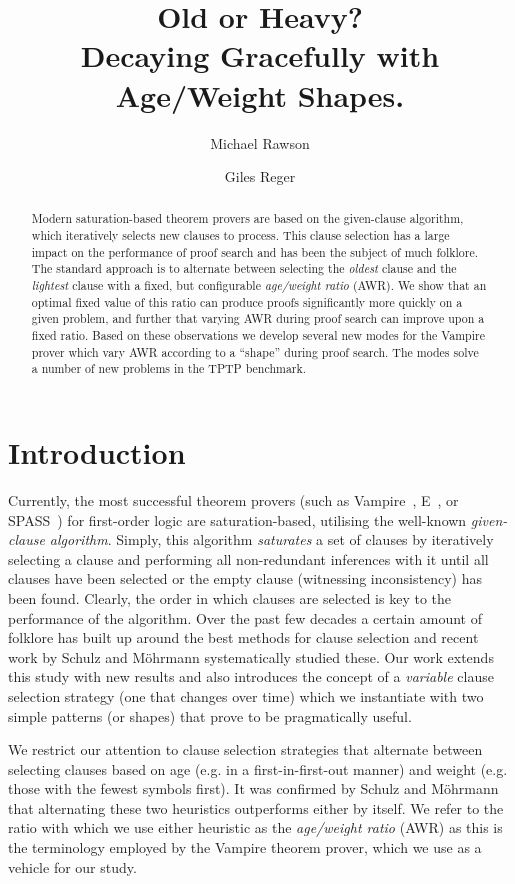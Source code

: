 \documentclass{llncs}
\title{Old or Heavy?\\Decaying Gracefully with Age/Weight Shapes.}
\author{Michael Rawson \and Giles Reger}
\institute{University of Manchester, Manchester, UK}
\newcommand{\sandm}{Schulz and M{\"{o}}hrmann}
\begin{document}
\maketitle
\begin{abstract}
Modern saturation-based theorem provers are based on the given-clause algorithm, which iteratively selects new clauses to process. This clause selection has a large impact on the performance of proof search and has been the subject of much folklore.  
The standard approach is to alternate between selecting the \emph{oldest} clause and the \emph{lightest} clause with a fixed, but configurable \emph{age/weight ratio} (AWR).
We show that an optimal fixed value of this ratio can produce proofs significantly more quickly on a given problem, and further that varying AWR during proof search can improve upon a fixed ratio.
Based on these observations we develop several new modes for the Vampire prover  which vary AWR according to a ``shape'' during proof search.
The modes solve a number of new problems in the TPTP benchmark.
\end{abstract}

\section{Introduction}
\label{sec:introduction}

Currently, the most successful theorem provers (such as Vampire~\cite{vampire}, E~\cite{}, or SPASS~\cite{}) for first-order logic are saturation-based, utilising the well-known \emph{given-clause algorithm}.
Simply, this algorithm \emph{saturates} a set of clauses by iteratively selecting a clause and performing all non-redundant inferences with it until all clauses have been selected or the empty clause (witnessing inconsistency) has been found.
Clearly, the order in which clauses are selected is key to the performance of the algorithm.
Over the past few decades a certain amount of folklore has built up around the best methods for clause selection and recent work by \sandm{} \cite{clause-selection-heuristics} systematically studied these.
Our work extends this study with new results and also introduces the concept of a \emph{variable} clause selection strategy (one that changes over time) which we instantiate with two simple patterns (or shapes) that prove to be pragmatically useful.

We restrict our attention to clause selection strategies that alternate between selecting clauses based on age (e.g. in a first-in-first-out manner) and weight (e.g. those with the fewest symbols first).
It was confirmed by \sandm{} that alternating these two heuristics outperforms either by itself.
We refer to the ratio with which we use either heuristic as the \emph{age/weight ratio} (AWR) as this is the terminology employed by the Vampire theorem prover, which we use as a vehicle for our study.
\end{document}
